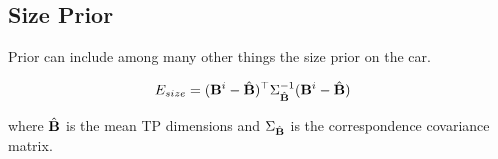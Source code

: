 \subsection{Size Prior}

Prior can include among many other things the size prior on the car.

\begin{align}
  \label{eq:totalSizeEnergy}
  E_{size} &= (\mathbf{B}^{i} - \hat{\mathbf{B}})^\top\Sigma_{\hat{\mathbf{B}}}^{-1}(\mathbf{B}^{i} -
  \hat{\mathbf{B}})
\end{align}

where $\hat{\mathbf{B}}$ is the mean TP dimensions and
$\Sigma_{\hat{\mathbf{B}}}$ is the correspondence covariance matrix.
